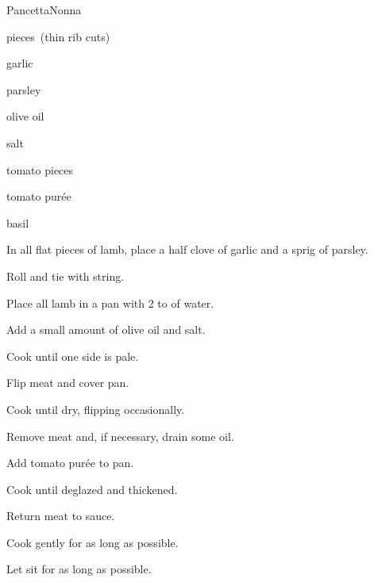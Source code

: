 \begin{recipe}{Pancetta}{Nonna}{}

\begin{ingredients}
\item {} pieces~(thin rib cuts)
\item garlic
\item parsley
\item olive oil
\item salt
\item tomato pieces
\item tomato pur\'ee
\item basil
\end{ingredients}

\begin{directions}
\item In all flat pieces of lamb, place a half clove of garlic and a sprig of parsley.
\item Roll and tie with string.
\item Place all lamb in a pan with 2 to  of water.
\item Add a small amount of olive oil and salt.
\item Cook until one side is pale.
\item Flip meat and cover pan.
\item Cook until dry, flipping occasionally.
\item Remove meat and, if necessary, drain some oil.
\item Add tomato pur\'ee to pan.
\item Cook until deglazed and thickened.
\item Return meat to sauce.
\item Cook gently for as long as possible.
\item Let sit for as long as possible.
\end{directions}

\end{recipe}
